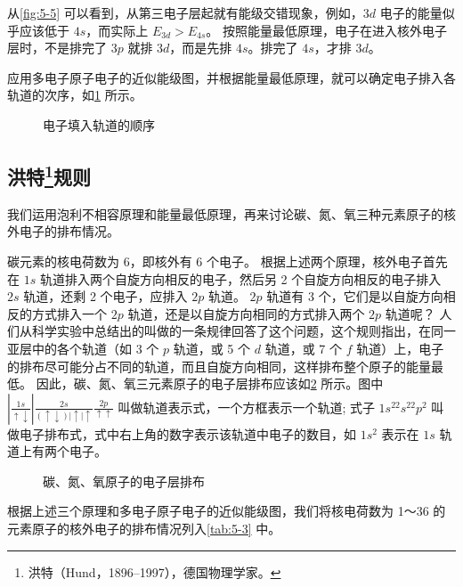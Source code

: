 从\cref{fig:5-5} 可以看到，从第三电子层起就有能级交错现象，例如，$3d$ 电子的能量似乎应该低于 $4s$，而实际上 $E_{3d}>E_{4s}$。
按照能量最低原理，电子在进入核外电子层时，不是排完了 $3p$ 就排 $3d$，而是先排 $4s$。排完了 $4s$，才排 $3d$。

应用多电子原子电子的近似能级图，并根据能量最低原理，就可以确定电子排入各轨道的次序，如\cref{fig:5-6} 所示。
\begin{figure}
  \caption{电子填入轨道的顺序}\label{fig:5-6}
\end{figure}

\subsection[洪特规则]{洪特\protect\footnote{洪特（Hund，1896--1997），德国物理学家。}规则}
我们运用泡利不相容原理和能量最低原理，再来讨论碳、氮、氧三种元素原子的核外电子的排布情况。

碳元素的核电荷数为 6，即核外有 6 个电子。
根据上述两个原理，核外电子首先在 $1s$ 轨道排入两个自旋方向相反的电子，然后另 2 个自旋方向相反的电子排入 $2s$ 轨道，还剩 2 个电子，应排入 $2p$ 轨道。
$2p$ 轨道有 3 个，它们是以自旋方向相反的方式排入一个 $2p$ 轨道，还是以自旋方向相同的方式排入两个 $2p$ 轨道呢？
人们从科学实验中总结出的叫做的一条规律回答了这个问题，这个规则指出，在同一亚层中的各个轨道（如 3 个 $p$ 轨道，或 5 个 $d$ 轨道，或 7 个 $f$ 轨道）上，电子的排布尽可能分占不同的轨道，而且自旋方向相同，这样排布整个原子的能量最低。
因此，碳、氮、氧三元素原子的电子层排布应该如\cref{fig:5-7} 所示。图中 \(\left| \frac{1s}{ \uparrow \downarrow }\right| \frac{2s}{\left( { \uparrow \downarrow }\right) \left| \uparrow \right| \uparrow }\frac{2p}{ \uparrow \uparrow }\) 叫做轨道表示式，一个方框表示一个轨道; 式子 $1s^22s^22p^2$ 叫做电子排布式，式中右上角的数字表示该轨道中电子的数目，如 $1s^2$ 表示在 $1s$ 轨道上有两个电子。
\begin{figure}
  \caption{碳、氮、氧原子的电子层排布}\label{fig:5-7}
\end{figure}

根据上述三个原理和多电子原子电子的近似能级图，我们将核电荷数为 1～36 的元素原子的核外电子的排布情况列入\cref{tab:5-3} 中。

\begin{table}
  \caption{核电荷数为 1～36 的元素的电子层排布}\label{tab:5-3}
\end{table}

